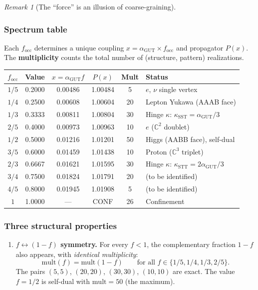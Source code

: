 \documentclass[12pt]{article}
\theoremstyle{remark}
\newtheorem{remark}[theorem]{Remark}
\theoremstyle{definition}
\newcommand{\CC}{\mathbb{C}}
\newcommand{\agut}{\alpha_{\mathrm{GUT}}}
\begin{document}
\begin{remark}[The ``force'' is an illusion of coarse-graining]
\subsubsection{Spectrum table}

Each $f_\mathrm{occ}$ determines a unique coupling $x = \agut \times f_\mathrm{occ}$ and propagator $P(x)$.  The \textbf{multiplicity} counts the total number of (structure, pattern) realizations.

\begin{center}
\begin{tabular}{cccccl}
\hline
$f_\mathrm{occ}$ & Value & $x = \agut f$ & $P(x)$ & Mult & Status \\
\hline
$1/5$ & 0.2000 & 0.00486 & 1.00484 & 5 & $e$, $\nu$ single vertex \\
$1/4$ & 0.2500 & 0.00608 & 1.00604 & 20 & Lepton Yukawa (AAAB face) \\
$1/3$ & 0.3333 & 0.00811 & 1.00804 & 30 & Hinge $\kappa$: $\kappa_\mathrm{SST} = \agut/3$ \\
$2/5$ & 0.4000 & 0.00973 & 1.00963 & 10 & $e$ ($\CC^2$ doublet) \\
$1/2$ & 0.5000 & 0.01216 & 1.01201 & 50 & Higgs (AABB face), self-dual \\
$3/5$ & 0.6000 & 0.01459 & 1.01438 & 10 & Proton ($\CC^3$ triplet) \\
$2/3$ & 0.6667 & 0.01621 & 1.01595 & 30 & Hinge $\kappa$: $\kappa_\mathrm{STT} = 2\agut/3$ \\
$3/4$ & 0.7500 & 0.01824 & 1.01791 & 20 & (to be identified) \\
$4/5$ & 0.8000 & 0.01945 & 1.01908 & 5 & (to be identified) \\
$1$   & 1.0000 & ---     & CONF    & 26 & Confinement \\
\hline
\end{tabular}
\end{center}

\subsubsection{Three structural properties}

\begin{enumerate}
\item \textbf{$f \leftrightarrow (1-f)$ symmetry.}  For every $f < 1$, the complementary fraction $1 - f$ also appears, with \emph{identical multiplicity}:
\begin{equation}
\mathrm{mult}(f) = \mathrm{mult}(1 - f) \qquad \text{for all } f \in \{1/5, 1/4, 1/3, 2/5\}.
\end{equation}
The pairs $(5, 5)$, $(20, 20)$, $(30, 30)$, $(10, 10)$ are exact.  The value $f = 1/2$ is self-dual with $\mathrm{mult} = 50$ (the maximum).


\end{enumerate}
\end{remark}
\end{document}
